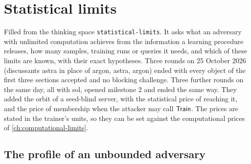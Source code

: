 \chapter{Statistical limits}\label{ch:statistical-limits}
Filled from the thinking space \texttt{statistical-limits}. It asks what an
adversary with unlimited computation achieves from the information a learning
procedure releases, how many samples, training runs or queries it needs, and which
of these limits are known, with their exact hypotheses. Three rounds on 25 October
2026 (discussants astra in place of argon, astra, argon) ended with every object
of the first three sections accepted and no blocking challenge. Three further rounds
on the same day, all with sol, opened milestone 2 and ended the same way. They
added the orbit of a seed-blind server, with the statistical price of reaching it, and
the price of membership when the attacker may call $\mathsf{Train}$. The prices are stated in
the trainer's units, so they can be set against the computational prices of
\cref{ch:computational-limits}.

\section{The profile of an unbounded adversary}


